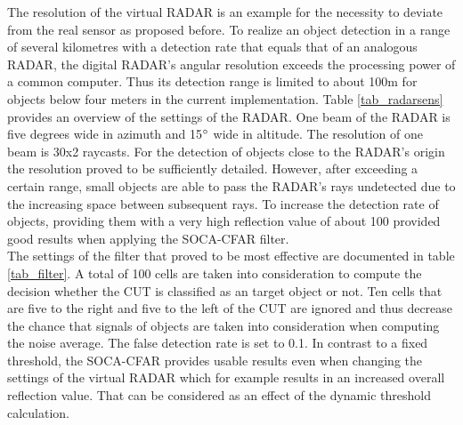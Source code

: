  The resolution of the virtual \ac{RADAR} is an example for the necessity to deviate from the real sensor as proposed before. To realize an object detection in a range of several kilometres with a detection rate that equals that of an analogous \ac{RADAR}, the digital \ac{RADAR}'s angular resolution exceeds the processing power of a common computer. Thus its detection range is limited to about 100m for objects below four meters in the current implementation. Table \ref{tab_radarsens} provides an overview of the settings of the \ac{RADAR}. One beam of the \ac{RADAR} is five degrees wide in azimuth and 15$\degree$ wide in altitude. The resolution of one beam is 30x2 raycasts. For the detection of objects close to the \ac{RADAR}'s origin the resolution proved to be sufficiently detailed. However, after exceeding a certain range, small objects are able to pass the \ac{RADAR}'s rays undetected due to the increasing space between subsequent rays. To increase the detection rate of objects, providing them with a very high reflection value of about 100 provided good results when applying the \ac{SOCA-CFAR} filter.\\ 
 
 The settings of the filter that proved to be most effective are documented in table \ref{tab_filter}. A total of 100 cells are taken into consideration to compute the decision whether the \ac{CUT} is classified as an target object or not. Ten cells that are five to the right and five to the left of the \ac{CUT} are ignored and thus decrease the chance that signals of objects are taken into consideration when computing the noise average. The false detection rate is set to 0.1. In contrast to a fixed threshold, the \ac{SOCA-CFAR} provides usable results even when changing the settings of the virtual \ac{RADAR} which for example results in an increased overall reflection value. That can be considered as an effect of the dynamic threshold    calculation.                                                                                                                                                                                                                                                                                  
  
